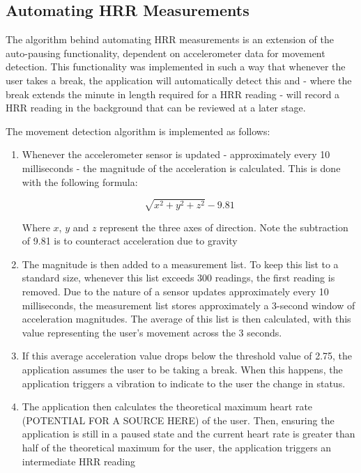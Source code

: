 \documentclass{l4proj}
\begin{document}
\subsection{Automating HRR Measurements}
\label{sec:autohrr}

The algorithm behind automating HRR measurements is an extension of the auto-pausing functionality, dependent on accelerometer data for movement detection. This functionality was implemented in such a way that whenever the user takes a break, the application will automatically detect this and - where the break extends the minute in length required for a HRR reading - will record a HRR reading in the background that can be reviewed at a later stage.

The movement detection algorithm is implemented as follows:

\begin{enumerate}
    \item Whenever the accelerometer sensor is updated - approximately every 10 milliseconds - the magnitude of the acceleration is calculated. This is done with the following formula:

    $$
    \sqrt{x^2 + y^2 + z^2} - 9.81
    $$
    
    Where $x$, $y$ and $z$ represent the three axes of direction. Note the subtraction of 9.81 is to counteract acceleration due to gravity
    \item The magnitude is then added to a measurement list. To keep this list to a standard size, whenever this list exceeds 300 readings, the first reading is removed. Due to the nature of a sensor updates approximately every 10 milliseconds, the measurement list stores approximately a 3-second window of acceleration magnitudes. The average of this list is then calculated, with this value representing the user’s movement across the 3 seconds.
    \item If this average acceleration value drops below the threshold value of 2.75, the application assumes the user to be taking a break. When this happens, the application triggers a vibration to indicate to the user the change in status. 
    \item The application then calculates the theoretical maximum heart rate (POTENTIAL FOR A SOURCE HERE) of the user. Then, ensuring the application is still in a paused state and the current heart rate is greater than half of the theoretical maximum for the user, the application triggers an intermediate HRR reading
\end{enumerate}
\end{document}
